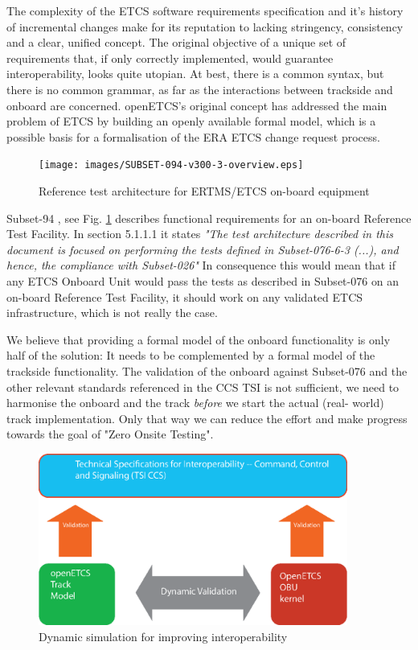 \documentclass{template/openetcs_article}
\begin{document}
The complexity of the ETCS software requirements specification and it's history of incremental changes make for its reputation to lacking stringency, consistency and a clear, unified concept. 
The original objective of a unique set of requirements that, if only correctly implemented, would guarantee interoperability, looks quite utopian.
At best, there is a common syntax, but there is no common grammar, as far as the interactions between trackside and onboard are concerned.\newline
openETCS's original concept has addressed the main problem of ETCS by building an openly available formal model, which is a possible basis for a formalisation of the ERA ETCS change request process.
\begin{figure}
 \centering
  \texttt{[image: images/SUBSET-094-v300-3-overview.eps]}
  \caption{Reference test architecture for ERTMS/ETCS on-board equipment}
   \label{fig:Subs94}
\end{figure}


Subset-94 \cite{Subset094}, see Fig. \ref{fig:Subs94} describes functional requirements for an on-board Reference Test Facility. In section 5.1.1.1 it states \emph{"The test architecture described in this document is focused on performing the tests defined in Subset-076-6-3 (...), and hence, the compliance with Subset-026"} In consequence this would mean that if any ETCS Onboard Unit would pass the tests as described in Subset-076 \cite{Subset076} on an on-board Reference Test Facility, it should work on any validated ETCS infrastructure, which is not really the case.

We believe that providing a formal model of the onboard functionality is only half of the solution: It needs to be complemented by a formal model of the trackside functionality. The validation of the onboard against Subset-076 and the other relevant standards referenced in the CCS TSI is not sufficient, we need to harmonise the onboard and the track \emph{before} we start the actual (real- world) track implementation. Only that way we can reduce the effort and make progress towards the goal of "Zero Onsite Testing".

\begin{figure}[H]
 \centering
  \includegraphics[width=4in]{images/DynamicSimulationForInterOp.eps}
  \caption{Dynamic simulation for improving interoperability}
   \label{fig:InterOpDynSim}
\end{figure}
\end{document}
